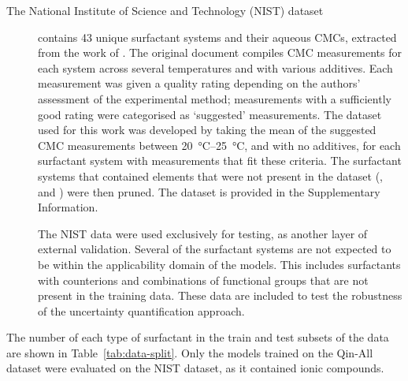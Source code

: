 \begin{description}
    \item[The National Institute of Science and Technology (NIST) dataset]
          contains 43 unique surfactant systems and their aqueous CMCs, extracted
          from the work of \citet{mukerjeeCriticalMicelleConcentrations1971}. The
          original document compiles CMC measurements for each system across
          several temperatures and with various additives. Each measurement was
          given a quality rating depending on the authors' assessment of the
          experimental method; measurements with a sufficiently good rating were
          categorised as `suggested' measurements. The dataset used for this work
          was developed by taking the mean of the suggested CMC measurements
          between \SIrange{20}{25}{\degreeCelsius}, and with no additives, for
          each surfactant system with measurements that fit these criteria. The
          surfactant systems that contained elements that were not present in the
          dataset (,  and ) were then pruned. The dataset is
          provided in the Supplementary Information.

          The NIST data were used exclusively for testing, as another layer of
          external validation. Several of the surfactant systems are not expected
          to be within the applicability domain of the models. This includes
          surfactants with counterions and combinations of functional groups that
          are not present in the training data. These data are included to test
          the robustness of the uncertainty quantification approach.
\end{description}

The number of each type of surfactant in the train and test subsets of the data are shown in Table~\ref{tab:data-split}. Only the models trained on the Qin-All dataset were evaluated on the NIST dataset, as it contained ionic compounds.

